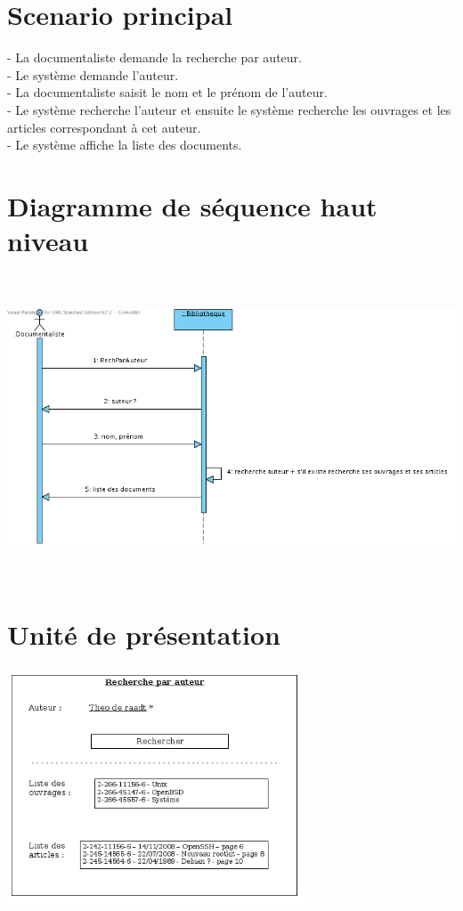 \documentclass[a4paper,10pt]{report}
\begin{document}
\section*{Scenario principal}
\begin{flushleft}
- La documentaliste demande la recherche par auteur.\\
- Le système demande l'auteur.\\
- La documentaliste saisit le nom et le prénom de l'auteur.\\
- Le système recherche l'auteur et ensuite le système recherche les ouvrages et les articles correspondant à cet auteur.\\
- Le système affiche la liste des documents.\\
\end{flushleft}

\bigskip

\section*{Diagramme de séquence haut niveau}
\includegraphics[height=90mm]{RechParAuteurHautNiveau.png}

\newpage

\section*{Unité de présentation}
\includegraphics[height=70mm]{UpRechParAuteur.png}
\end{document}
